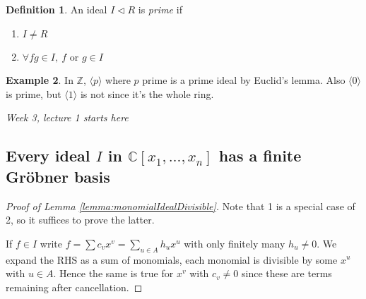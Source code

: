 \documentclass[a4paper]{article}
\theoremstyle{definition}
\newtheorem{defn}{Definition}[subsection]
\newtheorem{example}[defn]{Example}
\begin{document}
\begin{defn}
An ideal $I\lhd R$ is \textit{prime} if
\begin{enumerate}
\item $I\neq R$
\item $\forall fg\in I,\ f$ or $g\in I$
\end{enumerate}
\end{defn}
\begin{example}
In $\mathbb Z$, $\langle p\rangle$ where $p$ prime is a prime ideal by Euclid's lemma. Also $\langle 0\rangle$ is prime, but $\langle 1\rangle$ is not since it's the whole ring.
\end{example}

\begin{flushright}
\textit{Week 3, lecture 1 starts here}
\end{flushright}

\subsection{Every ideal $I$ in $\mathbb C[x_1,\ldots,x_n]$ has a finite Gröbner basis}

\begin{proof}[Proof of Lemma \ref{lemma:monomialIdealDivisible}]
Note that 1 is a special case of 2, so it suffices to prove the latter.

If $f\in I$ write $f=\sum c_v x^v = \sum_{u\in A} h_u x^u$ with only finitely many $h_u\neq 0$. We expand the RHS as a sum of monomials, each monomial is divisible by some $x^u$ with $u\in A$. Hence the same is true for $x^v$ with $c_v\neq 0$ since these are terms remaining after cancellation.
\end{proof}
\end{document}

